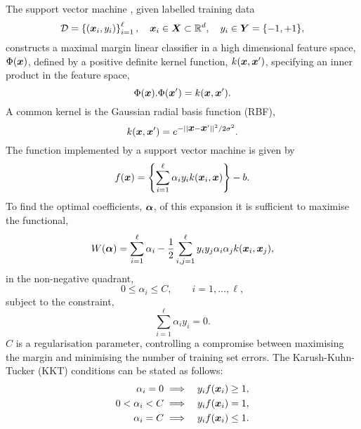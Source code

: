 \documentclass[twoside]{article}
\renewcommand{\vec}[1]{\mbox{\boldmath ${#1}$}}
\begin{document}
The support vector machine \cite{Boser1992,Cortes1995}, given labelled
training data
%
\begin{displaymath}
   \mathcal{D} = \left\{ (\vec{x}_i, y_i) \right\}_{i = 1}^{\ell}, \quad \vec{x}_i \in \vec{X} \subset {\mathbb R}^d, \quad y_i \in \vec{Y} = \{-1, +1\},
\end{displaymath}
%
constructs a maximal margin linear classifier in a high dimensional feature
space, $\Phi(\vec{x})$, defined by a positive definite kernel function,
$k(\vec{x},\vec{x}')$, specifying an inner product in the feature space,
%
\begin{displaymath}
   \Phi(\vec{x}).\Phi(\vec{x}') = k(\vec{x}, \vec{x}').
\end{displaymath}
%
A common kernel is the Gaussian radial basis function (RBF),
%
\begin{displaymath}
   k(\vec{x}, \vec{x}') = e^{-||\vec{x} - \vec{x}'||^2/2\sigma^2}.
\end{displaymath}
%
The function implemented by a support vector machine is given by
%
\begin{equation}
   f(\vec{x}) = \left\{ \sum_{i=1}^{\ell}\alpha_iy_ik(\vec{x}_i,\vec{x}) \right\} - b.
   \label{eqn:expansion}
\end{equation}
%
To find the optimal coefficients, $\vec{\alpha}$, of this expansion it is
sufficient to maximise the functional,
%
\begin{equation}
   W(\vec{\alpha}) = \sum_{i=1}^{\ell}\alpha_i - \frac{1}{2}\sum_{i,j=1}^{\ell}y_iy_j\alpha_i\alpha_jk(\vec{x}_i, \vec{x}_j),
   \label{eqn:objective}
\end{equation}
%
in the non-negative quadrant,
%
\begin{equation}
   0 \leq \alpha_i \leq C, \qquad i = 1, \ldots, \ell,
   \label{eqn:non_negatvity_constraint}
\end{equation}
%
subject to the constraint,
%
\begin{equation}
   \sum_{i=1}^{\ell}\alpha_iy_i = 0.
   \label{eqn:linear_equality_constraint}
\end{equation}
%
$C$ is a regularisation parameter, controlling a compromise between maximising
the margin and minimising the number of training set errors.  The
Karush-Kuhn-Tucker (KKT) conditions can be stated as follows:
%
\begin{eqnarray}
   \alpha_i     = 0 & \implies & y_if(\vec{x}_i) \geq 1,\\
   0 < \alpha_i < C & \implies & y_if(\vec{x}_i) =    1, \label{eqn:kkt2} \\
   \alpha_i     = C & \implies & y_if(\vec{x}_i) \leq 1.
\end{eqnarray}
\end{document}

